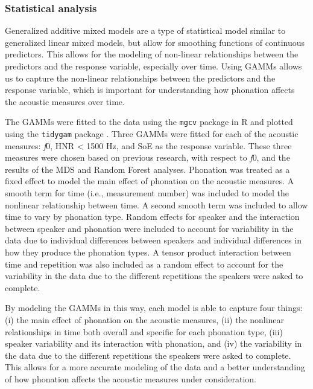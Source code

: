 \subsubsection{Statistical analysis} \label{sec:statistical_analysis}

Generalized additive mixed models \citep[GAMM;][]{hastieGeneralizedAdditiveModels1986,woodGeneralizedAdditiveModels2017} are a type of statistical model similar to generalized linear mixed models, but allow for smoothing functions of continuous predictors. This allows for the modeling of non-linear relationships between the predictors and the response variable, especially over time. Using GAMMs allows us to capture the non-linear relationships between the predictors and the response variable, which is important for understanding how phonation affects the acoustic measures over time. 

The GAMMs were fitted to the data using the \texttt{mgcv} package in R \citep{woodGeneralizedAdditiveModels2017} and plotted using the \texttt{tidygam} package \citep{corettaTidygamTidyPrediction2024}. Three GAMMs were fitted for each of the acoustic measures: \textit{f}0, HNR < 1500 Hz, and SoE as the response variable. These three measures were chosen based on previous research, with respect to \textit{f}0, and the results of the MDS and Random Forest analyses. Phonation was treated as a fixed effect to model the main effect of phonation on the acoustic measures. A smooth term for time (i.e., measurement number)  was included to model the nonlinear relationship between time. A second smooth term was included to allow time to vary by phonation type. Random effects for speaker and the interaction between speaker and phonation were included to account for variability in the data due to individual differences between speakers and individual differences in how they produce the phonation types. A tensor product interaction between time and repetition was also included as a random effect to account for the variability in the data due to the different repetitions the speakers were asked to complete. 

By modeling the GAMMs in this way, each model is able to capture four things: (i) the main effect of phonation on the acoustic measures, (ii) the nonlinear relationships in time both overall and specific for each phonation type, (iii) speaker variability and its interaction with phonation, and (iv) the variability in the data due to the different repetitions the speakers were asked to complete. This allows for a more accurate modeling of the data and a better understanding of how phonation affects the acoustic measures under consideration. 

